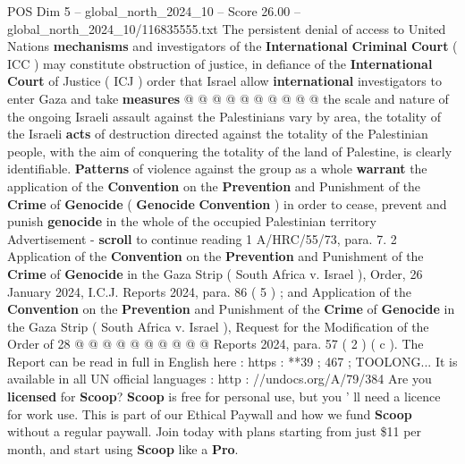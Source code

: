 \begin{textsample}{POS Dim 5 – global\_north\_2024\_10 – Score 26.00 – global\_north\_2024\_10/116835555.txt}
The persistent denial of access to United Nations \textbf{mechanisms} and investigators of the \textbf{International} \textbf{Criminal} \textbf{Court} ( ICC ) may constitute obstruction of justice, in defiance of the \textbf{International} \textbf{Court} of Justice ( ICJ ) order that Israel allow \textbf{international} investigators to enter Gaza and take \textbf{measures} @ @ @ @ @ @ @ @ @ @ the scale and nature of the ongoing Israeli assault against the Palestinians vary by area, the totality of the Israeli \textbf{acts} of destruction directed against the totality of the Palestinian people, with the aim of conquering the totality of the land of Palestine, is clearly identifiable. \textbf{Patterns} of violence against the group as a whole \textbf{warrant} the application of the \textbf{Convention} on the \textbf{Prevention} and Punishment of the \textbf{Crime} of \textbf{Genocide} ( \textbf{Genocide} \textbf{Convention} ) in order to cease, prevent and punish \textbf{genocide} in the whole of the occupied Palestinian territory Advertisement - \textbf{scroll} to continue reading 1 A/HRC/55/73, para. 7. 2 Application of the \textbf{Convention} on the \textbf{Prevention} and Punishment of the \textbf{Crime} of \textbf{Genocide} in the Gaza Strip ( South Africa v.
Israel ), Order, 26 January 2024, I.C.J.
Reports 2024, para. 86 ( 5 ) ; and Application of the \textbf{Convention} on the \textbf{Prevention} and Punishment of the \textbf{Crime} of \textbf{Genocide} in the Gaza Strip ( South Africa v.
Israel ), Request for the Modification of the Order of 28 @ @ @ @ @ @ @ @ @ @ Reports 2024, para. 57 ( 2 ) ( c ).
The Report can be read in full in English here : https : **39 ; 467 ; TOOLONG...
It is available in all UN official languages : http : //undocs.org/A/79/384 Are you \textbf{licensed} for \textbf{Scoop}? \textbf{Scoop} is free for personal use, but you ' ll need a licence for work use.
This is part of our Ethical Paywall and how we fund \textbf{Scoop} without a regular paywall.
Join today with plans starting from just \$11 per month, and start using \textbf{Scoop} like a \textbf{Pro}.

\end{textsample}
